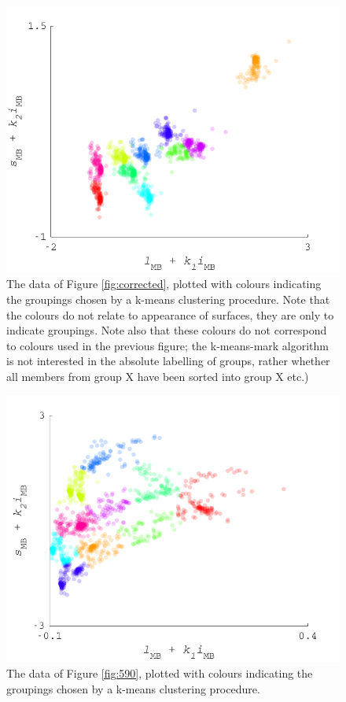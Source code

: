 \begin{figure}[htbp]
 \includegraphics[max width=\textwidth]{figs/comp/KMeansMarkDemo/1.pdf}
 \caption{The data of Figure \ref{fig:corrected}, plotted with colours indicating the groupings chosen by a k-means clustering procedure. Note that the colours do not relate to appearance of surfaces, they are only to indicate groupings. Note also that these colours do not correspond to colours used in the previous figure; the k-means-mark algorithm is not interested in the absolute labelling of groups, rather whether all members from group X have been sorted into group X etc.)}
 \label{fig:KM1}
\end{figure} 

\begin{figure}[htbp]
 \includegraphics[max width=\textwidth]{figs/comp/KMeansMarkDemo/2.pdf}
 \caption{The data of Figure \ref{fig:590}, plotted with colours indicating the groupings chosen by a k-means clustering procedure.}
 \label{fig:KM2}
\end{figure} 

